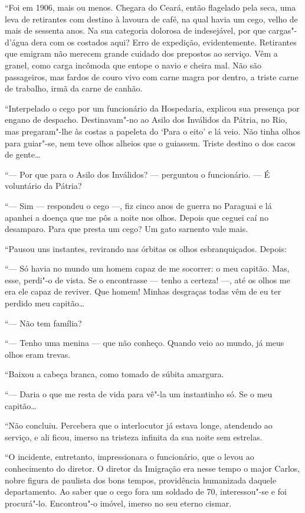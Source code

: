 ``Foi em 1906, mais ou menos. Chegara do Ceará, então flagelado pela
seca, uma leva de retirantes com destino à lavoura de café, na qual
havia um cego, velho de mais de sessenta anos. Na sua categoria dolorosa
de indesejável, por que cargas"-d'água dera com os costados aqui? Erro de
expedição, evidentemente. Retirantes que emigram não merecem grande
cuidado dos prepostos ao serviço. Vêm a granel, como carga incômoda que
entope o navio e cheira mal. Não são passageiros, mas fardos de couro
vivo com carne magra por dentro, a triste carne de trabalho, irmã da
carne de canhão.

``Interpelado o cego por um funcionário da Hospedaria, explicou sua
presença por engano de despacho. Destinavam"-no ao Asilo dos Inválidos da
Pátria, no Rio, mas pregaram"-lhe às costas a papeleta do `Para o eito' e
lá veio. Não tinha olhos para guiar"-se, nem teve olhos alheios que o
guiassem. Triste destino o dos cacos de gente\ldots{}

``--- Por que para o Asilo dos Inválidos? --- perguntou o funcionário.
--- É voluntário da Pátria?

``--- Sim --- respondeu o cego ---, fiz cinco anos de guerra no Paraguai
e lá apanhei a doença que me pôs a noite nos olhos. Depois que ceguei
caí no desamparo. Para que presta um cego? Um gato sarnento vale mais.

``Pausou uns instantes, revirando nas órbitas os olhos esbranquiçados.
Depois:

``--- Só havia no mundo um homem capaz de me socorrer: o meu capitão.
Mas, esse, perdi"-o de vista. Se o encontrasse --- tenho a certeza! ---,
até os olhos me era ele capaz de reviver. Que homem! Minhas desgraças
todas vêm de eu ter perdido meu capitão\ldots{}

``--- Não tem família?

``--- Tenho uma menina --- que não conheço. Quando veio ao mundo, já
meus olhos eram trevas.

``Baixou a cabeça branca, como tomado de súbita amargura.

``--- Daria o que me resta de vida para vê"-la um instantinho só. Se o
meu capitão\ldots{}

``Não concluiu. Percebera que o interlocutor já estava longe, atendendo
ao serviço, e ali ficou, imerso na tristeza infinita da sua noite sem
estrelas.

``O incidente, entretanto, impressionara o funcionário, que o levou ao
conhecimento do diretor. O diretor da Imigração era nesse tempo o major
Carlos, nobre figura de paulista dos bons tempos, providência humanizada
daquele departamento. Ao saber que o cego fora um soldado de 70,
interessou"-se e foi procurá"-lo. Encontrou"-o imóvel, imerso no seu eterno
cismar.

